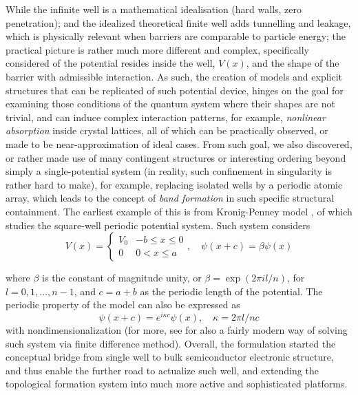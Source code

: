 While the infinite well is a mathematical idealisation (hard walls, zero penetration); and the idealized theoretical finite well adds tunnelling and leakage, which is physically relevant when barriers are comparable to particle energy; the practical picture is rather much more different and complex, specifically considered of the potential resides inside the well, $V(x)$, and the shape of the barrier with admissible interaction. As such, the creation of models and explicit structures that can be replicated of such potential device, hinges on the goal for examining those conditions of the quantum system where their shapes are not trivial, and can induce complex interaction patterns, for example, \textit{nonlinear absorption} inside crystal lattices, all of which can be practically observed, or made to be near-approximation of ideal cases. From such goal, we also discovered, or rather made use of many contingent structures or interesting ordering beyond simply a single-potential system (in reality, such confinement in singularity is rather hard to make), for example, replacing isolated wells by a periodic atomic array, which leads to the concept of \textit{band formation} in such specific structural containment. The earliest example of this is from Kronig-Penney model \cite{10.1098/rspa.1931.0019}, of which studies the square-well periodic potential system. Such system considers
\begin{equation}
    V(x) = \begin{cases}
        V_{0} & -b \leq x \leq 0 \\
        0 & 0 < x \leq a
    \end{cases}
    , \quad 
    \psi(x+c) = \beta\psi(x)
\end{equation}

where $\beta$ is the constant of magnitude unity, or $\beta=\exp{(2\pi i l /n)}$, for $l=0,1,\dots,n-1$, and $c=a+b$ as the periodic length of the potential. The periodic property of the model can also be expressed as
\begin{equation}
    \psi(x+c) = e^{i\kappa c}\psi(x), \quad \kappa = 2\pi l/nc
\end{equation}
with nondimensionalization (for more, see \cite{li2024onedimensionperiodicpotentialsschrodinger} for also a fairly modern way of solving such system via finite difference method). Overall, the formulation started the conceptual bridge from single well to bulk semiconductor electronic structure, and thus enable the further road to actualize such well, and extending the topological formation system into much more active and sophisticated platforms. 

